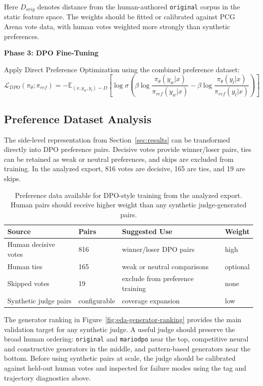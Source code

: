 \documentclass[11pt,a4paper]{article}
\theoremstyle{plain}
\theoremstyle{definition}
\theoremstyle{remark}
\begin{document}
Here $D_{orig}$ denotes distance from the human-authored \texttt{original} corpus in the static feature space. The weights should be fitted or calibrated against PCG Arena vote data, with human votes weighted more strongly than synthetic preferences.

\textbf{Phase 3: DPO Fine-Tuning}

Apply Direct Preference Optimization using the combined preference dataset:
\begin{equation}
\mathcal{L}_{DPO}(\pi_\theta; \pi_{ref}) = -\mathbb{E}_{(x, y_w, y_l) \sim D} \left[ \log \sigma \left( \beta \log \frac{\pi_\theta(y_w|x)}{\pi_{ref}(y_w|x)} - \beta \log \frac{\pi_\theta(y_l|x)}{\pi_{ref}(y_l|x)} \right) \right]
\end{equation}

\subsection{Preference Dataset Analysis}
\label{subsec:preference-dataset}

The side-level representation from Section~\ref{sec:results} can be transformed directly into DPO preference pairs. Decisive votes provide winner/loser pairs, ties can be retained as weak or neutral preferences, and skips are excluded from training. In the analyzed export, 816 votes are decisive, 165 are ties, and 19 are skips.

\begin{table}[H]
\centering
\caption{Preference data available for DPO-style training from the analyzed export. Human pairs should receive higher weight than any synthetic judge-generated pairs.}
\label{tab:dpo-dataset}
\begin{tabular}{llll}
\toprule
\textbf{Source} & \textbf{Pairs} & \textbf{Suggested Use} & \textbf{Weight} \\
\midrule
Human decisive votes & 816 & winner/loser DPO pairs & high \\
Human ties & 165 & weak or neutral comparisons & optional \\
Skipped votes & 19 & exclude from preference training & none \\
Synthetic judge pairs & configurable & coverage expansion & low \\
\bottomrule
\end{tabular}
\end{table}

The generator ranking in Figure~\ref{fig:eda-generator-ranking} provides the main validation target for any synthetic judge. A useful judge should preserve the broad human ordering: \texttt{original} and \texttt{mariodpo} near the top, competitive neural and constructive generators in the middle, and pattern-based generators near the bottom. Before using synthetic pairs at scale, the judge should be calibrated against held-out human votes and inspected for failure modes using the tag and trajectory diagnostics above.
\end{document}
